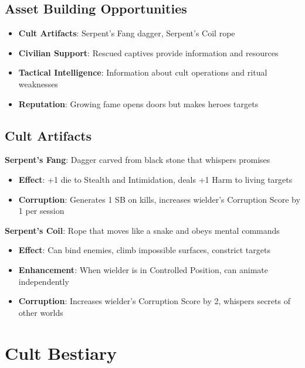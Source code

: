 \documentclass[11pt]{article}
\begin{document}
\subsection{Asset Building Opportunities}

\begin{itemize}[leftmargin=*]
    \item \textbf{Cult Artifacts}: Serpent's Fang dagger, Serpent's Coil rope
    \item \textbf{Civilian Support}: Rescued captives provide information and resources
    \item \textbf{Tactical Intelligence}: Information about cult operations and ritual weaknesses
    \item \textbf{Reputation}: Growing fame opens doors but makes heroes targets
\end{itemize}

\subsection{Cult Artifacts}

\textbf{Serpent's Fang}: Dagger carved from black stone that whispers promises
\begin{itemize}[leftmargin=*]
    \item \textbf{Effect}: +1 die to Stealth and Intimidation, deals +1 Harm to living targets
    \item \textbf{Corruption}: Generates 1 SB on kills, increases wielder's Corruption Score by 1 per session
\end{itemize}

\textbf{Serpent's Coil}: Rope that moves like a snake and obeys mental commands
\begin{itemize}[leftmargin=*]
    \item \textbf{Effect}: Can bind enemies, climb impossible surfaces, constrict targets
    \item \textbf{Enhancement}: When wielder is in Controlled Position, can animate independently
    \item \textbf{Corruption}: Increases wielder's Corruption Score by 2, whispers secrets of other worlds
\end{itemize}

\newpage

\section{Cult Bestiary}
\end{document}
